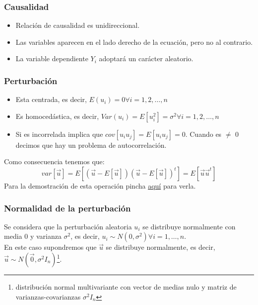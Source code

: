 \documentclass[a4paper,12pt]{article}
\begin{document}
\subsubsection{Causalidad}

\begin{itemize}
    \item Relación de causalidad es unidireccional.
    \item Las variables aparecen en el lado derecho de la ecuación, pero no al contrario.
    \item La variable dependiente $Y_i$ adoptará un carácter aleatorio.
\end{itemize}

\subsubsection{Perturbación}
\begin{itemize}
    \item Esta centrada, es decir, $E(u_i) = 0 \forall i=1,2,\ldots,n$
    \item Es homocedástica, es decir, $Var(u_i) = E[u_i^{2}]= \sigma^2 \forall i=1,2,\ldots,n$
    \item Si es incorrelada implica que $cov[u_iu_j] = E[u_iu_j]=0$. Cuando es $\neq$ 0 decimos que hay un problema de autocorrelación.
\end{itemize}

Como consecuencia tenemos que:
\begin{equation}
    var[\vec{u}] = E[(\vec{u}-E[\vec{u}])(\vec{u}-E[\vec{u}])^{t}] = E[\vec{u}\vec{u}^{t}]
\end{equation}
Para la demostración de esta operación pincha \href{https://github.com/ElblogdeIsmael/ElblogdeIsmael.github.io/blob/main/Asignaturas/Tercer%20A%C3%B1o/ECO/Formulario/FCCEE/ecotema2_1.pdf}{aquí} para verla.

\subsubsection{Normalidad de la perturbación}

Se considera que la perturbación aleatoria $u_i$ se distribuye normalmente con media 0 y varianza $\sigma^2$, es decir, $u_i \sim N(0,\sigma^2)\forall i=1,\ldots,n$.\\

En este caso supondremos que $\vec{u}$ se distribuye normalmente, es decir, $\vec{u} \sim N(\vec{0},\sigma^2I_n)$\footnote{distribución normal multivariante con vector de medias nulo y matriz de varianzas-covarianzas $\sigma^2I_n$}.
\end{document}
